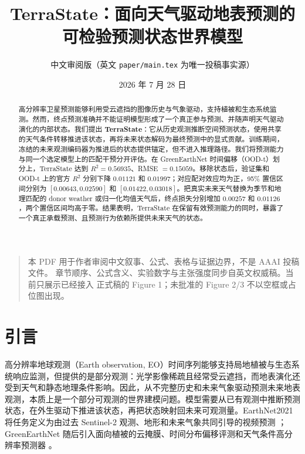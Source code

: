 \documentclass[11pt,a4paper,fontset=fandol]{ctexart}
\title{\bfseries TerraState：面向天气驱动地表预测的\\可检验预测状态世界模型}
\author{中文审阅版（英文 \texttt{paper/main.tex} 为唯一投稿事实源）}
\date{2026 年 7 月 28 日}
\begin{document}
\maketitle

\begin{quote}\small
本 PDF 用于作者审阅中文叙事、公式、表格与证据边界，不是 AAAI 投稿文件。
章节顺序、公式含义、实验数字与主张强度同步自英文权威稿。当前只展示已经接入
正式稿的 Figure 1；未批准的 Figure 2/3 不以空框或占位图出现。
\end{quote}

\tableofcontents
\clearpage
{}
\begin{abstract}

高分辨率卫星预测能够利用受云遮挡的图像历史与气象驱动，支持植被和生态系统监测。然而，终点预测准确并不能证明模型形成了一个真正参与预测、并随声明天气驱动演化的内部状态。我们提出 \textbf{TerraState}：它从历史观测推断空间预测状态，使用共享的天气条件转移推进该状态，再将未来状态解码为最终预测中的显式贡献。训练期间，冻结的未来观测编码器为推进后的状态提供锚定，但不进入推理路径。我们将预测能力与同一个选定模型上的匹配干预分开评估。在 GreenEarthNet 时间偏移（OOD-t）划分上，TerraState 达到 $R^2=0.56935$、RMSE $=0.15059$。移除状态后，验证集和 OOD-t 上的官方 $R^2$ 分别下降 $0.01121$ 和 $0.01997$；对应配对效应均为正，95\% 置信区间分别为 $[0.00643,0.02590]$ 和 $[0.01422,0.03018]$。把真实未来天气替换为季节和地理匹配的 donor weather 或归一化均值天气后，终点损失分别增加 $0.00257$ 和 $0.01126$，两个置信区间均高于零。结果表明，TerraState 在保留有效预测能力的同时，暴露了一个真正承载预测、且预测行为依赖所提供未来天气的状态。

\end{abstract}

\section{引言}

高分辨率地球观测（Earth observation, EO）时间序列能够支持局地植被与生态系统响应监测，但提供的是部分观测：光学影像稀疏且经常受云遮挡，而地表演化还受到天气和静态地理条件影响。因此，从不完整历史和未来气象驱动预测未来地表观测，本质上是一个部分可观测的世界建模问题。模型需要从已有观测中推断预测状态，在外生驱动下推进该状态，再把状态映射回未来可观测量。EarthNet2021 将任务定义为由过去 Sentinel-2 观测、地形和未来气象共同引导的视频预测 \cite{requenamesa2021earthnet}；GreenEarthNet 随后引入面向植被的云掩膜、时间分布偏移评测和天气条件高分辨率预测器 \cite{benson2024multimodal}。
\end{document}
